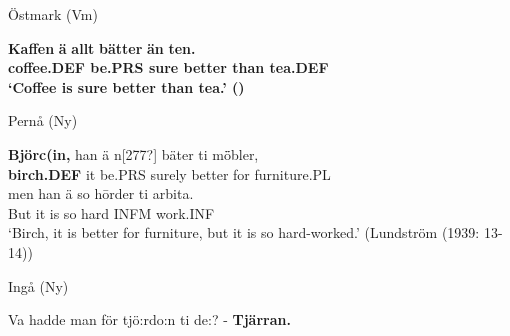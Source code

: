 Östmark (Vm) 



 \ea\label{}
\gll \textbf{Kaffen} \textbf{ä}\textbf{  allt}\textbf{  bätter}\textbf{  än} \textbf{ten.}\\

\bfseries
coffee.DEF  be.PRS  sure  better   than  tea.DEF\\

\glt ‘Coffee is sure better than tea.’ (\citet{Broberg1936})

\z

\item 

Pernå (Ny) 



 \ea\label{}
\gll \textbf{Björc(in,} han  ä  n[277?]  bäter  ti  m\={ö}bler,\\


\textbf{birch.DEF} it  be.PRS  surely  better  for  furniture.PL\\

 \ea\label{}
\gll men  han  ä  so  h\=order  ti  arbita.\\


But  it  is  so  hard  INFM   work.INF\\

\glt ‘Birch, it is better for furniture, but it is so hard-worked.’ (Lundström (1939: 13-14))

\z

\item 

Ingå (Ny)



 \ea\label{}
\gll Va  hadde  man  för  tjö:rdo:n  ti  de:?  {}-  \textbf{Tjärran.}\\


